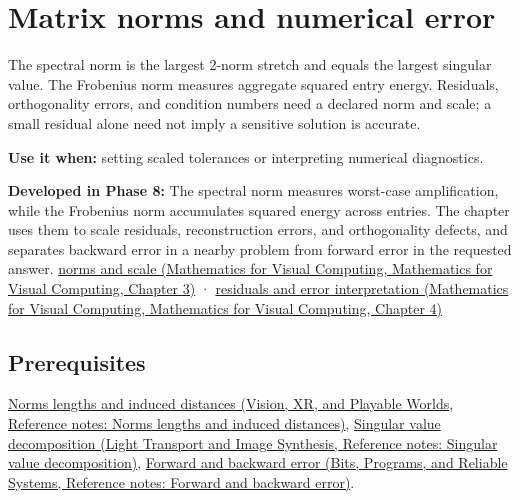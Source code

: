 \hypertarget{appendix-f8657bac66e5}{}\label{referencestart:appendix-f8657bac66e5}
\section{Matrix norms and numerical error}\label{appendix-f8657bac66e5-matrix-norms-and-numerical-error}

The spectral norm is the largest 2-norm stretch and equals the largest singular value. The Frobenius norm measures aggregate squared entry energy. Residuals, orthogonality errors, and condition numbers need a declared norm and scale; a small residual alone need not imply a sensitive solution is accurate.

\textbf{Use it when:} setting scaled tolerances or interpreting numerical diagnostics.

\textbf{Developed in Phase 8:} The spectral norm measures worst-case amplification, while the Frobenius norm accumulates squared energy across entries. The chapter uses them to scale residuals, reconstruction errors, and orthogonality defects, and separates backward error in a nearby problem from forward error in the requested answer. \href{../02-Mathematics-for-Visual-Computing/main.pdf\#nameddest=01-foundations-i-ch019-matrix-norms-put-scale-into-error-statements}{norms and scale (Mathematics for Visual Computing, Mathematics for Visual Computing, Chapter 3)} · \href{../02-Mathematics-for-Visual-Computing/main.pdf\#nameddest=01-foundations-i-ch020-residuals-distinguish-backward-accuracy-from-forward-certainty}{residuals and error interpretation (Mathematics for Visual Computing, Mathematics for Visual Computing, Chapter 4)}

\subsection{Prerequisites}\label{appendix-f8657bac66e5-prerequisites}

\href{../07-Vision-XR-and-Playable-Worlds/main.pdf\#nameddest=appendix-49933872bb51}{Norms lengths and induced distances (Vision, XR, and Playable Worlds, Reference notes: Norms lengths and induced distances)}, \href{../04-Light-Transport-and-Image-Synthesis/main.pdf\#nameddest=appendix-1fad5e7f36fa}{Singular value decomposition (Light Transport and Image Synthesis, Reference notes: Singular value decomposition)}, \href{../01-Bits-Programs-and-Reliable-Systems/main.pdf\#nameddest=appendix-a7fbaf6d1b1c}{Forward and backward error (Bits, Programs, and Reliable Systems, Reference notes: Forward and backward error)}.

